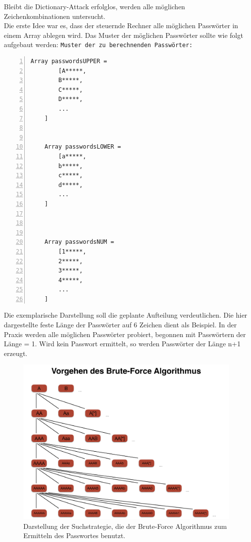 Bleibt die Dictionary-Attack erfolglos, werden alle möglichen Zeichenkombinationen untersucht. \\
Die erste Idee war es, dass der steuernde Rechner alle möglichen Passwörter in einem Array ablegen wird. Das Muster der möglichen Passwörter sollte wie folgt aufgebaut werden: 
\texttt{Muster der zu berechnenden Passwörter:}
\begin{lstlisting}[basicstyle=\ttfamily,numbers=left,numberstyle=\footnotesize\ttfamily,backgroundcolor=\color{sourcegray}]
	Array passwordsUPPER = 
		[A*****,
	 	B*****,
	 	C*****,
	 	D*****,
	 	...
	]
	
	
	Array passwordsLOWER = 
		[a*****,
	 	b*****,
	 	c*****,
	 	d*****,
		...
	]
	
	

	Array passwordsNUM = 
		[1*****,
	 	2*****,
	 	3*****,
	 	4*****,
		...
	]
\end{lstlisting}

Die exemplarische Darstellung soll die geplante Aufteilung verdeutlichen. Die hier dargestellte feste Länge der Passwörter auf 6 Zeichen dient als Beispiel. In der Praxis werden alle möglichen Passwörter probiert, begonnen mit Passwörtern der Länge = 1. Wird kein Passwort ermittelt, so werden Passwörter der Länge n+1 erzeugt.  \\

\begin{figure}[!ht]
	\centering
		\includegraphics[natwidth=1200pt, natheight=349pt, width=1.0\textwidth]{images/SchaubildAlgorithmBreitensuche.pdf}
	\caption{Darstellung der Suchstrategie, die der Brute-Force Algorithmus zum Ermitteln des Passwortes benutzt.}
	\label{fig:showcase}
\end{figure}

